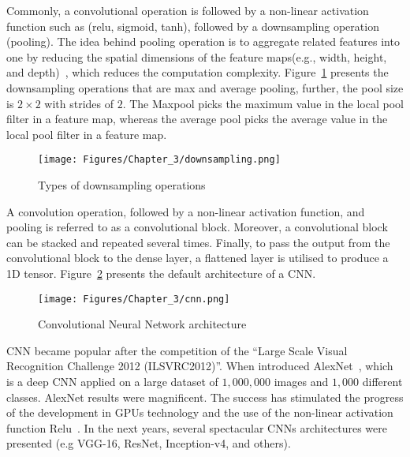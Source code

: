 Commonly, a convolutional operation is followed by a non-linear activation function such as (relu, sigmoid, tanh), followed by a downsampling operation (pooling).
The idea behind pooling operation is to aggregate related features into one by reducing the spatial dimensions of the feature maps(e.g., width, height, and depth)~\cite{Lecun2015}, which reduces the computation complexity.
Figure~\ref{fig:downsampling} presents the downsampling operations that are max and average pooling, further, the pool size is \(2 \times 2\) with strides of \(2\).
The Maxpool picks the maximum value in the local pool filter in a feature map, whereas the average pool picks the average value in the local pool filter in a feature map.
\begin{figure} [!ht]
	\begin{center}
		\centering
		\texttt{[image: Figures/Chapter\_3/downsampling.png]}
	\end{center}
	\caption{Types of downsampling operations} 
	\label{fig:downsampling}
\end{figure}
A convolution operation, followed by a non-linear activation function, and pooling is referred to as a convolutional block.
Moreover, a convolutional block can be stacked and repeated several times. 
Finally, to pass the output from the convolutional block to the dense layer, a flattened layer is utilised to produce a 1D tensor.
Figure~\ref{fig:CNN} presents the default architecture of a CNN.
\begin{figure} [!ht]
	\begin{center}
		\centering
		\texttt{[image: Figures/Chapter\_3/cnn.png]}
	\end{center}
	\caption{Convolutional Neural Network architecture} 
	\label{fig:CNN}
\end{figure}

CNN became popular after the competition of the \enquote{Large Scale Visual Recognition Challenge 2012 (ILSVRC2012)}. 
When \textcite{Krizhevsky2012} introduced AlexNet~\cite{Krizhevsky2012}, which is a deep CNN applied on a large dataset of \(1,000,000\) images and \(1,000\) different classes.
AlexNet results were magnificent. 
The success has stimulated the progress of the development in GPUs technology and the use of the non-linear activation function Relu~\cite{Lecun2015}.
In the next years, several spectacular CNNs architectures were presented (e.g VGG-16, ResNet, Inception-v4, and others).
